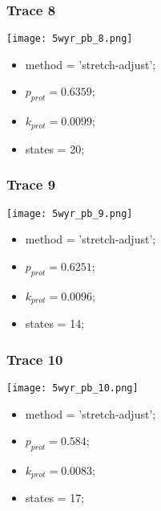 \subsubsection{Trace 8}
\begin{minipage}[c]{0.7\textwidth}
    \texttt{[image: 5wyr\_pb\_8.png]}
\end{minipage}
\hfill
\begin{minipage}[c]{0.45\textwidth}
    \begin{itemize}
        \item method = 'stretch-adjust';
        \item $p_{prot}=0.6359$;
        \item $k_{prot}=0.0099$;
        \item states = 20;
    \end{itemize}
\end{minipage}

\subsubsection{Trace 9}
\begin{minipage}[c]{0.7\textwidth}
    \texttt{[image: 5wyr\_pb\_9.png]}
\end{minipage}
\hfill
\begin{minipage}[c]{0.45\textwidth}
    \begin{itemize}
        \item method = 'stretch-adjust';
        \item $p_{prot}=0.6251$;
        \item $k_{prot}=0.0096$;
        \item states = 14;
    \end{itemize}
\end{minipage}

\subsubsection{Trace 10}
\begin{minipage}[c]{0.7\textwidth}
    \texttt{[image: 5wyr\_pb\_10.png]}
\end{minipage}
\hfill
\begin{minipage}[c]{0.45\textwidth}
    \begin{itemize}
        \item method = 'stretch-adjust';
        \item $p_{prot}=0.584$;
        \item $k_{prot}=0.0083$;
        \item states = 17;
    \end{itemize}
\end{minipage}

